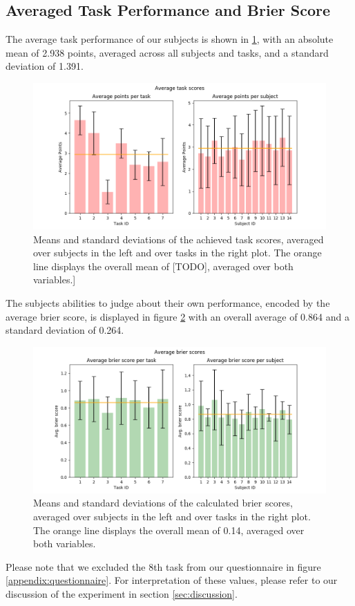 \documentclass[../main/main.tex]{subfiles}
\begin{document}
\subsection{Averaged Task Performance and Brier Score}
The average task performance of our subjects is shown in \ref{fig:avg_scores}, with an absolute mean of 2.938 points, averaged across all subjects and tasks, and a standard deviation of 1.391.
\begin{figure}[H]
	\centering
	\captionsetup{justification=centering}
	\includegraphics[width=\textwidth]{../assets/average_task_scores.png}
	\caption{Means and standard deviations of the achieved task scores, averaged over subjects in the left and over tasks in the right plot. The orange line displays the overall mean of [TODO], averaged over both variables.]}
	\label{fig:avg_scores}
\end{figure}
The subjects abilities to judge about their own performance, encoded by the average brier score, is displayed in figure \ref{fig:avg_brier} with an overall average of 0.864 and a standard deviation of 0.264. 
\begin{figure}[H]
	\centering
	\captionsetup{justification=centering}
	\includegraphics[width=\textwidth]{../assets/average_brier_scores.png}
	\caption{Means and standard deviations of the calculated brier scores, averaged over subjects in the left and over tasks in the right plot. The orange line displays the overall mean of 0.14, averaged over both variables.}
	\label{fig:avg_brier} 
\end{figure}
Please note that we excluded the 8th task from our questionnaire in figure \ref{appendix:questionnaire}. For interpretation of these values, please refer to our discussion of the experiment in section \ref{sec:discussion}.
\end{document}
